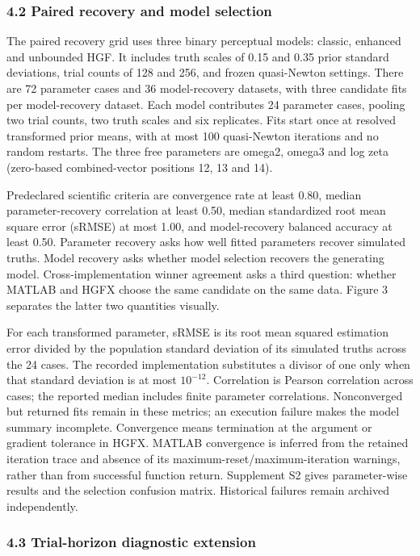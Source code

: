 \documentclass[
  11pt,
]{article}
\begin{document}
\subsubsection{4.2 Paired recovery and model
selection}\label{paired-recovery-and-model-selection}

The paired recovery grid uses three binary perceptual models: classic,
enhanced and unbounded HGF. It includes truth scales of 0.15 and 0.35
prior standard deviations, trial counts of 128 and 256, and frozen
quasi-Newton settings. There are 72 parameter cases and 36
model-recovery datasets, with three candidate fits per model-recovery
dataset. Each model contributes 24 parameter cases, pooling two trial
counts, two truth scales and six replicates. Fits start once at resolved
transformed prior means, with at most 100 quasi-Newton iterations and no
random restarts. The three free parameters are omega2, omega3 and log
zeta (zero-based combined-vector positions 12, 13 and 14).

Predeclared scientific criteria are convergence rate at least 0.80,
median parameter-recovery correlation at least 0.50, median standardized
root mean square error (sRMSE) at most 1.00, and model-recovery balanced
accuracy at least 0.50. Parameter recovery asks how well fitted
parameters recover simulated truths. Model recovery asks whether model
selection recovers the generating model. Cross-implementation winner
agreement asks a third question: whether MATLAB and HGFX choose the same
candidate on the same data. Figure 3 separates the latter two quantities
visually.

For each transformed parameter, sRMSE is its root mean squared
estimation error divided by the population standard deviation of its
simulated truths across the 24 cases. The recorded implementation
substitutes a divisor of one only when that standard deviation is at
most \(10^{-12}\). Correlation is Pearson correlation across cases; the
reported median includes finite parameter correlations. Nonconverged but
returned fits remain in these metrics; an execution failure makes the
model summary incomplete. Convergence means termination at the argument
or gradient tolerance in HGFX. MATLAB convergence is inferred from the
retained iteration trace and absence of its
maximum-reset/maximum-iteration warnings, rather than from successful
function return. Supplement S2 gives parameter-wise results and the
selection confusion matrix. Historical failures remain archived
independently.

\subsubsection{4.3 Trial-horizon diagnostic
extension}\label{trial-horizon-diagnostic-extension}
\end{document}
